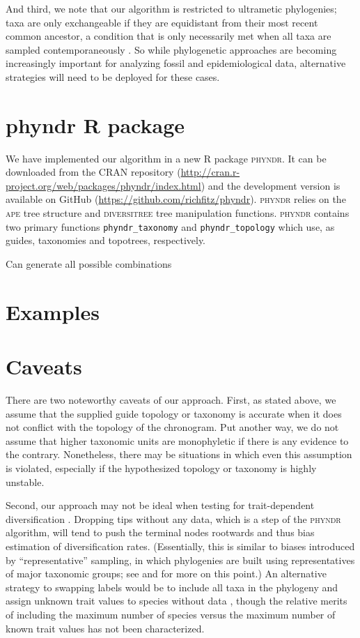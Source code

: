 \documentclass[a4paper,11pt]{article}
\begin{document}
And third, we note that our algorithm is restricted to ultrametic phylogenies; taxa are only exchangeable if they are equidistant from their most recent common ancestor, a condition that is only necessarily met when all taxa are sampled contemporaneously \citep[see][for more discussion of this point and its implications for models of trait evolution]{SlaterMEE}. So while phylogenetic approaches are becoming increasingly important for analyzing fossil and epidemiological data, alternative strategies will need to be deployed for these cases.

\section{phyndr R package}

We have implemented our algorithm in a new R package \textsc{phyndr}. It can be downloaded from the CRAN repository (\url{http://cran.r-project.org/web/packages/phyndr/index.html}) and the development version is available on GitHub (\url{https://github.com/richfitz/phyndr}). \textsc{phyndr} relies on the \textsc{ape} \citep{ape} tree structure and \textsc{diversitree} \citep{FitzJohn2012} tree manipulation functions. \textsc{phyndr} contains two primary functions \texttt{phyndr\_taxonomy} and \texttt{phyndr\_topology} which use, as guides, taxonomies and topotrees, respectively. 

Can generate all possible combinations


\section{Examples}

\section{Caveats}

There are two noteworthy caveats of our approach. First, as stated above, we assume that the supplied guide topology or taxonomy is accurate when it does not conflict with the topology of the chronogram. Put another way, we do not assume that higher taxonomic units are monophyletic if there is any evidence to the contrary. Nonetheless, there may be situations in which even this assumption is violated, especially if the hypothesized topology or taxonomy is highly unstable. 

Second, our approach may not be ideal when testing for trait-dependent diversification \citep[e.g.,][]{Maddison2007, FitzJohn2012}. Dropping tips without any data, which is a step of the \textsc{phyndr} algorithm, will tend to push the terminal nodes rootwards and thus bias estimation of diversification rates. (Essentially, this is similar to biases introduced by ``representative'' sampling, in which phylogenies are built using representatives of major taxonomic groups; see \citealt{Hohna2011} and \citealt{Stadler2013} for more on this point.) An alternative strategy to swapping labels would be to include all taxa in the phylogeny and assign unknown trait values to species without data \citep{FitzJohn2009}, though the relative merits of including the maximum number of species versus the maximum number of known trait values has not been characterized.
\end{document}
